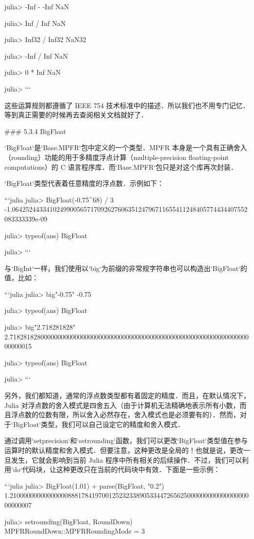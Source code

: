 julia> -Inf - -Inf
NaN

julia> Inf / Inf
NaN

julia> Inf32 / Inf32
NaN32

julia> -Inf / Inf
NaN

julia> 0 * Inf
NaN

julia> 
```

这些运算规则都遵循了 IEEE 754 技术标准中的描述．所以我们也不用专门记忆．等到真正需要的时候再去查阅相关文档就好了．

### 5.3.4 BigFloat

`BigFloat`是`Base.MPFR`包中定义的一个类型．MPFR 本身是一个具有正确舍入（rounding）功能的用于多精度浮点计算（multiple-precision floating-point computations）的 C 语言程序库．而`Base.MPFR`包只是对这个库再次封装．

`BigFloat`类型代表着任意精度的浮点数．示例如下：

```julia
julia> BigFloat(-0.75^68) / 3
-1.064252443341024990056571709262760635124796711655411248405774434407552083333339e-09

julia> typeof(ans)
BigFloat

julia> 
```

与`BigInt`一样，我们使用以`big`为前缀的非常规字符串也可以构造出`BigFloat`的值，比如：

```julia
julia> big"-0.75"
-0.75

julia> typeof(ans)
BigFloat

julia> big"2.718281828"
2.718281828000000000000000000000000000000000000000000000000000000000000000000015

julia> typeof(ans)
BigFloat

julia> 
```

另外，我们都知道，通常的浮点数类型都有着固定的精度．而且，在默认情况下，Julia 对浮点数的舍入模式是四舍五入（由于计算机无法精确地表示所有小数，而且浮点数的位数有限，所以舍入必然存在，舍入模式也是必须要有的）．然而，对于`BigFloat`类型，我们可以自己设定它的精度和舍入模式．

通过调用`setprecision`和`setrounding`函数，我们可以更改`BigFloat`类型值在参与运算时的默认精度和舍入模式．但要注意，这种更改是全局的！也就是说，更改一旦发生，它就会影响到当前 Julia 程序中所有相关的后续操作．不过，我们可以利用`do`代码块，让这种更改只在当前的代码块中有效．下面是一些示例：

```julia
julia> BigFloat(1.01) + parse(BigFloat, "0.2")
1.210000000000000008881784197001252323389053344726562500000000000000000000000007

julia> setrounding(BigFloat, RoundDown)
MPFRRoundDown::MPFRRoundingMode = 3

